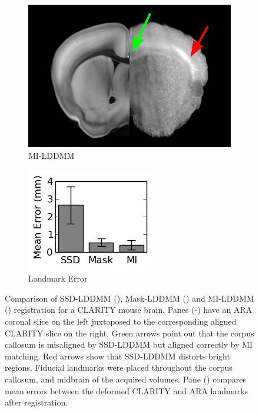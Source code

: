 \documentclass[simplex.tex]{subfiles}
\begin{document}
\begin{figure}[!h]
\begin{cframed}
\begin{subfigure}{0.25\columnwidth}
  \includegraphics[width=\textwidth]{../../figs/miCoronal.png}  
  \caption{MI-LDDMM}
  \label{fig:clarityCoronalMI}
 \end{subfigure}
 \begin{subfigure}{0.2\columnwidth}
  \includegraphics[width=\textwidth]{../../figs/lmkError.png}  
  \caption{Landmark Error}
  \label{fig:lmkError}
 \end{subfigure}
 \caption{Comparison of SSD-LDDMM (), Mask-LDDMM () and MI-LDDMM () registration for a CLARITY mouse brain.
  Panes (-) have an ARA coronal slice on the left juxtaposed to the corresponding aligned CLARITY slice on the right.
  Green arrows point out that the corpus callosum is misaligned by SSD-LDDMM but aligned correctly by MI matching.
  Red arrows show that SSD-LDDMM distorts bright regions.
  Fiducial landmarks were placed throughout the corpus callosum, and midbrain of the acquired volumes.
  Pane () compares mean errors between the deformed CLARITY and ARA landmarks after registration.
 }
 \label{fig:comparison}
\end{cframed}
\end{figure}

\clearpage
\end{document}

